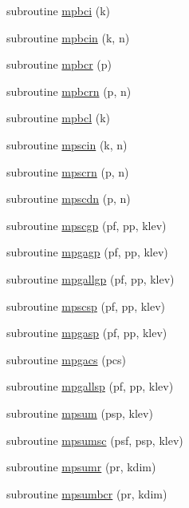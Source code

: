 \begin{DoxyCompactItemize}
\item 
subroutine \hyperlink{mpimod_8f90_a89982355acc98319bfc191dab28da805}{mpbci} (k)
\item 
subroutine \hyperlink{mpimod_8f90_a85cfae5acde5c37604edf690e9c2f7cf}{mpbcin} (k, n)
\item 
subroutine \hyperlink{mpimod_8f90_aded092db7f8071a727e2e96887702ca7}{mpbcr} (p)
\item 
subroutine \hyperlink{mpimod_8f90_af2a0a009162180d4abb1daa1bad60cf2}{mpbcrn} (p, n)
\item 
subroutine \hyperlink{mpimod_8f90_a40b910e38273e7f3c9dc4ed36d3e67a0}{mpbcl} (k)
\item 
subroutine \hyperlink{mpimod_8f90_a8338d8609afcefbb1faa41f353c10ef9}{mpscin} (k, n)
\item 
subroutine \hyperlink{mpimod_8f90_a1504cf64a1ffc198a8a1fe54ba00d775}{mpscrn} (p, n)
\item 
subroutine \hyperlink{mpimod_8f90_a3d2a5d231fd9527bcbc1fde327326922}{mpscdn} (p, n)
\item 
subroutine \hyperlink{mpimod_8f90_ac66e76c6144dfeadbc03bc5817553250}{mpscgp} (pf, pp, klev)
\item 
subroutine \hyperlink{mpimod_8f90_aaa1210298789f4fd7b7702c276eb80a9}{mpgagp} (pf, pp, klev)
\item 
subroutine \hyperlink{mpimod_8f90_a0d1453ad027ffece9843cdeff7178f79}{mpgallgp} (pf, pp, klev)
\item 
subroutine \hyperlink{mpimod_8f90_a0c5adf4e8c7e39cf5a1038a1d34ebf30}{mpscsp} (pf, pp, klev)
\item 
subroutine \hyperlink{mpimod_8f90_ac053a575b1230f8e4a296164dba5ab27}{mpgasp} (pf, pp, klev)
\item 
subroutine \hyperlink{mpimod_8f90_a5aef7e33503e0c46b1d8c0b984c398d1}{mpgacs} (pcs)
\item 
subroutine \hyperlink{mpimod_8f90_a54cf45feb57177de8eaab2e6b01a7aa2}{mpgallsp} (pf, pp, klev)
\item 
subroutine \hyperlink{mpimod_8f90_af894efd9525c935f22415e017dcbc482}{mpsum} (psp, klev)
\item 
subroutine \hyperlink{mpimod_8f90_a75a681a8d4b9ab5ba0d4fa97f909647b}{mpsumsc} (psf, psp, klev)
\item 
subroutine \hyperlink{mpimod_8f90_af2111ef6d5b772479a74e94d351440f0}{mpsumr} (pr, kdim)
\item 
subroutine \hyperlink{mpimod_8f90_ad703e6ecd123e9b8280322e402d57d20}{mpsumbcr} (pr, kdim)

\end{DoxyCompactItemize}
